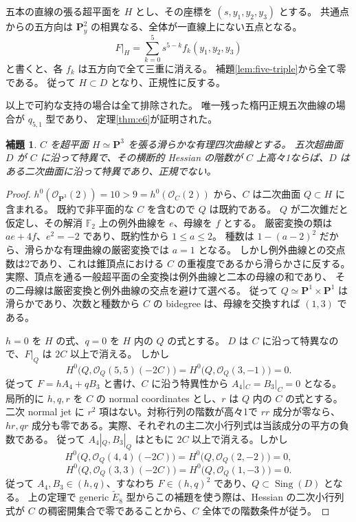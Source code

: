 \documentclass[11pt,a4paper]{ltjsarticle}
\newcommand{\PP}{\mathbf P}\renewcommand{\AA}{\mathbf A}
\newtheorem{lemma}[theorem]{補題}
\theoremstyle{remark}\newtheorem{remark}[theorem]{注意}
\begin{document}
五本の直線の張る超平面を $H$ とし、その座標を $(s,y_1,y_2,y_3)$ とする。
共通点からの五方向は $\PP^2_y$ の相異なる、全体が一直線上にない五点となる。
\[
F|_H=\sum_{k=0}^5s^{5-k}f_k(y_1,y_2,y_3)
\]
と書くと、各 $f_k$ は五方向で全て三重に消える。
補題\ref{lem:five-triple}から全て零である。
従って $H\subset D$ となり、正規性に反する。

以上で可約な支持の場合は全て排除された。
唯一残った楕円正規五次曲線の場合が $q_{5,1}$ 型であり、
定理\ref{thm:e6}が証明された。


\begin{lemma}\label{lem:rational-space-quartic-v15}
$C$ を超平面 $H\simeq\PP^3$ を張る滑らかな有理四次曲線とする。
五次超曲面 $D$ が $C$ に沿って特異で、その横断的 Hessian の階数が
$C$ 上高々1ならば、$D$ はある二次曲面に沿って特異であり、正規でない。
\end{lemma}

\begin{proof}
$h^0(\mathcal O_{\PP^3}(2))=10>9=h^0(\mathcal O_C(2))$ から、$C$ は二次曲面 $Q\subset H$ に含まれる。
既約で非平面的な $C$ を含むので $Q$ は既約である。
$Q$ が二次錐だと仮定し、その解消 $\mathbb F_2$ 上の例外曲線を $e$、母線を $f$ とする。
厳密変換の類は $ae+4f$、$e^2=-2$ であり、既約性から $1\le a\le2$。
種数は $1-(a-2)^2$ だから、滑らかな有理曲線の厳密変換では $a=1$ となる。
しかし例外曲線との交点数は2であり、これは錐頂点における $C$ の重複度であるから滑らかさに反する。
実際、頂点を通る一般超平面の全変換は例外曲線と二本の母線の和であり、
その二母線は厳密変換と例外曲線の交点を避けて選べる。
従って $Q\simeq\PP^1\times\PP^1$ は滑らかであり、次数と種数から
$C$ の bidegree は、母線を交換すれば $(1,3)$ である。

$h=0$ を $H$ の式、$q=0$ を $H$ 内の $Q$ の式とする。
$D$ は $C$ に沿って特異なので、$F|_Q$ は $2C$ 以上で消える。
しかし
\[
 H^0\bigl(Q,\mathcal O_Q(5,5)(-2C)\bigr)
       =H^0\bigl(Q,\mathcal O_Q(3,-1)\bigr)=0.
\]
従って $F=hA_4+qB_3$ と書け、$C$ に沿う特異性から $A_4|_C=B_3|_C=0$ となる。
局所的に $h,q,r$ を $C$ の normal coordinates とし、$r$ は $Q$ 内の $C$ の式とする。
二次 normal jet に $r^2$ 項はない。対称行列の階数が高々1で $rr$ 成分が零なら、
$hr,qr$ 成分も零である。実際、それぞれの主二次小行列式は当該成分の平方の負数である。
従って $A_4|_Q,B_3|_Q$ はともに $2C$ 以上で消える。しかし
\[
 H^0\bigl(Q,\mathcal O_Q(4,4)(-2C)\bigr)=H^0\bigl(Q,\mathcal O_Q(2,-2)\bigr)=0,
\]
\[
 H^0\bigl(Q,\mathcal O_Q(3,3)(-2C)\bigr)=H^0\bigl(Q,\mathcal O_Q(1,-3)\bigr)=0.
\]
従って $A_4,B_3\in(h,q)$、すなわち $F\in(h,q)^2$ であり、$Q\subset\operatorname{Sing}(D)$ となる。
上の定理で generic $\widetilde E_8$ 型からこの補題を使う際は、Hessian の二次小行列式が
$C$ の稠密開集合で零であることから、$C$ 全体での階数条件が従う。
\end{proof}
\end{document}
